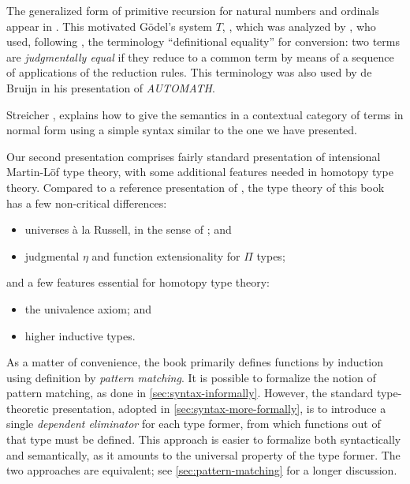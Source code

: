 The generalized form of primitive recursion for natural numbers and ordinals
appear in \cite{Hilbert-1925}. This motivated G\"odel's system $T$,
\cite{Goedel-T-1958}, which was analyzed by \cite{Tait-1966}, who used,
following \cite{Goedel-T-1958}, the terminology ``definitional equality'' for
conversion: two terms are \emph{judgmentally equal} if they reduce to a
common term by means of a sequence of applications of the reduction
rules. This terminology was also used by de Bruijn \cite{deBruijn-1973} in his
presentation of \emph{AUTOMATH}.

Streicher \cite[Theorem 4.13]{Streicher-1991}, explains how to give the
semantics in a contextual category of terms in normal form using a simple syntax
similar to the one we have presented.

Our second presentation comprises fairly standard presentation of
intensional Martin-L\"{o}f type theory, with some additional features needed in
homotopy type theory. Compared to a reference presentation of
\cite{hofmann:syntax-and-semantics}, the type theory of this book has a few
non-critical differences:
%
\begin{itemize}
\item universes \`{a} la Russell, in the sense of
\cite{martin-lof:bibliopolis}; and
\item judgmental $\eta$ and function extensionality for $\Pi$ types;
\end{itemize}
and a few features essential for homotopy type theory:
\begin{itemize}
\item the univalence axiom; and
\item higher inductive types.
\end{itemize}
%
As a matter of convenience, the book primarily defines functions by induction
using definition by \emph{pattern matching}.
%
%
It is possible to formalize the
notion of pattern matching, as done in \autoref{sec:syntax-informally}. However, the
standard type-theoretic presentation, adopted in \autoref{sec:syntax-more-formally}, is to introduce a single \emph{dependent
eliminator} for each type former, from which functions out of that type must be
defined. This approach is easier to formalize both syntactically and
semantically, as it amounts to the universal property of the type former.
The two approaches are equivalent; see \autoref{sec:pattern-matching} for a
longer discussion.

%
%


